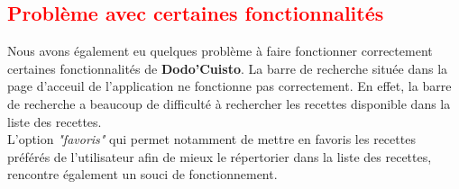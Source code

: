 \documentclass{article}
\begin{document}
\subsection{\textcolor{red}{Problème avec certaines fonctionnalités}}

Nous avons également eu quelques problème à faire fonctionner correctement certaines fonctionnalités de \textbf{Dodo’Cuisto}. La barre de recherche située dans la page d’acceuil de l’application ne fonctionne pas correctement. En effet, la barre de recherche a beaucoup de difficulté à rechercher les recettes disponible dans la liste des recettes.\\

L’option \textit{"favoris"} qui permet notamment de mettre en favoris les recettes préférés de l’utilisateur afin de mieux le répertorier dans la liste des recettes, rencontre également un souci de fonctionnement.\\
\end{document}
